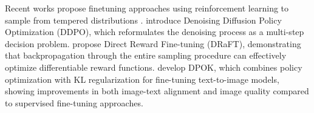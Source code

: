 Recent works propose finetuning approaches using reinforcement learning to sample from tempered distributions \citep{domingoenrich2025adjointmatchingfinetuningflow, venkatraman2024amortizing, NEURIPS2023_fc65fab8, black2024trainingdiffusionmodelsreinforcement, clark2024directlyfinetuningdiffusionmodels, uehara2025inferencetimealignmentdiffusionmodels}. \citet{black2024trainingdiffusionmodelsreinforcement} introduce Denoising Diffusion Policy Optimization (DDPO), which reformulates the denoising process as a multi-step decision problem. \citet{clark2024directlyfinetuningdiffusionmodels} propose Direct Reward Fine-tuning (DRaFT), demonstrating that backpropagation through the entire sampling procedure can effectively optimize differentiable reward functions. \citet{NEURIPS2023_fc65fab8}  develop DPOK, which combines policy optimization with KL regularization for fine-tuning text-to-image models, showing improvements in both image-text alignment and image quality compared to supervised fine-tuning approaches.